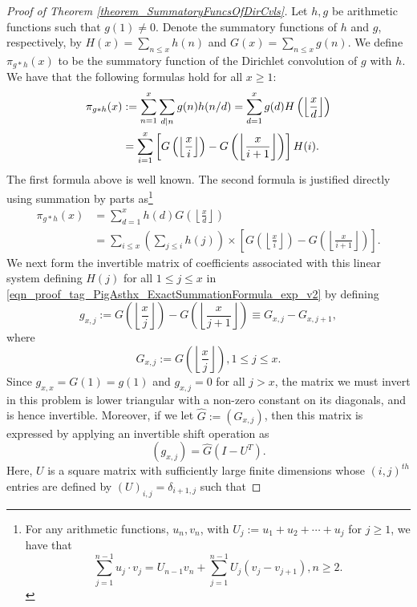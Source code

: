 \documentclass[11pt,reqno,a4letter]{article}
\numberwithin{figure}{section}
\numberwithin{table}{section}
\newcommand{\floor}[1]{\left\lfloor #1 \right\rfloor}
\newcommand{\Floor}[2]{\ensuremath{\left\lfloor \frac{#1}{#2} \right\rfloor}}
\theoremstyle{plain}
\numberwithin{theorem}{section}
\theoremstyle{definition}
\begin{document}
\begin{proof}[Proof of Theorem \ref{theorem_SummatoryFuncsOfDirCvls}] 
\label{proofOf_theorem_SummatoryFuncsOfDirCvls} 
Let $h,g$ be arithmetic functions such that $g(1) \neq 0$. 
Denote the summatory functions of $h$ and $g$, 
respectively, by $H(x) = \sum_{n \leq x} h(n)$ and $G(x) = \sum_{n \leq x} g(n)$. 
We define $\pi_{g \ast h}(x)$ to be the summatory function of the 
Dirichlet convolution of $g$ with $h$. 
We have that the following formulas hold for all $x \geq 1$: 
\begin{align} 
\notag 
\pi_{g \ast h}(x) & := \sum_{n=1}^{x} \sum_{d|n} g(n) h(n/d) = \sum_{d=1}^x g(d) H\left(\floor{\frac{x}{d}}\right) \\ 
\label{eqn_proof_tag_PigAsthx_ExactSummationFormula_exp_v2} 
     & = \sum_{i=1}^x \left[G\left(\floor{\frac{x}{i}}\right) - G\left(\floor{\frac{x}{i+1}}\right)\right] H(i). 
\end{align} 
The first formula above is well known. The second formula is justified directly using 
summation by parts as\footnote{
     For any arithmetic functions, $u_n,v_n$, 
     with $U_j := u_1+u_2+\cdots+u_j$ for $j \geq 1$, we have that 
     \cite[\S 2.10(ii)]{NISTHB} 
     \[
     \sum_{j=1}^{n-1} u_j \cdot v_j = U_{n-1} v_n + 
          \sum_{j=1}^{n-1} U_j \left(v_j - v_{j+1}\right), n \geq 2. 
     \]
} 
\begin{align*} 
\pi_{g \ast h}(x) & = \sum_{d=1}^x h(d) G\left(\floor{\frac{x}{d}}\right) \\ 
     & = \sum_{i \leq x} \left(\sum_{j \leq i} h(j)\right) \times 
     \left[G\left(\floor{\frac{x}{i}}\right) - 
     G\left(\floor{\frac{x}{i+1}}\right)\right]. 
\end{align*} 
We next form the invertible matrix of coefficients associated with this linear system defining $H(j)$ for all 
$1 \leq j \leq x$ in \eqref{eqn_proof_tag_PigAsthx_ExactSummationFormula_exp_v2} by defining 
\[
g_{x,j} := G\left(\floor{\frac{x}{j}}\right) - G\left(\floor{\frac{x}{j+1}}\right) \equiv G_{x,j} - G_{x,j+1}, 
\] 
where 
\[
G_{x,j} := G\left(\Floor{x}{j}\right), 1 \leq j \leq x. 
\]
Since $g_{x,x} = G(1) = g(1)$ and $g_{x,j} = 0$ for all $j > x$, 
the matrix we must invert in this problem is lower triangular with a non-zero 
constant on its diagonals, and is hence invertible. 
Moreover, if we let $\hat{G} := (G_{x,j})$, then this matrix is 
expressed by applying an invertible shift operation as 
\[
(g_{x,j}) = \hat{G} (I - U^{T}). 
\]
Here, $U$ is a square matrix with sufficiently large finite dimensions 
whose $(i,j)^{th}$ entries are defined by $(U)_{i,j} = \delta_{i+1,j}$ such that 

\end{proof}
\end{document}
